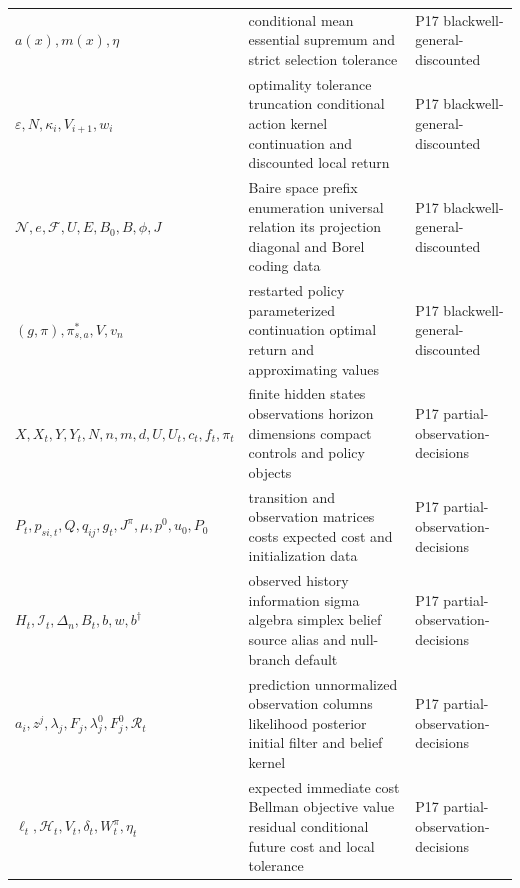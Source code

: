 \begin{longtable}{@{}p{}p{}p{}@{}}
\(a(x),\allowbreak m(x),\allowbreak \eta\) & conditional mean essential supremum and strict selection tolerance & P17 blackwell-\allowbreak{}general-\allowbreak{}discounted \\
\(\varepsilon,\allowbreak N,\allowbreak \kappa_i,\allowbreak V_{i+1},\allowbreak w_i\) & optimality tolerance truncation conditional action kernel continuation and discounted local return & P17 blackwell-\allowbreak{}general-\allowbreak{}discounted \\
\(\mathcal N,\allowbreak e,\allowbreak \mathcal F,\allowbreak U,\allowbreak E,\allowbreak B_0,\allowbreak B,\allowbreak \phi,\allowbreak J\) & Baire space prefix enumeration universal relation its projection diagonal and Borel coding data & P17 blackwell-\allowbreak{}general-\allowbreak{}discounted \\
\((g,\allowbreak \pi),\allowbreak \pi^*_{s,a},\allowbreak V,\allowbreak v_n\) & restarted policy parameterized continuation optimal return and approximating values & P17 blackwell-\allowbreak{}general-\allowbreak{}discounted \\
\(X,\allowbreak X_t,\allowbreak Y,\allowbreak Y_t,\allowbreak N,\allowbreak n,\allowbreak m,\allowbreak d,\allowbreak U,\allowbreak U_t,\allowbreak c_t,\allowbreak f_t,\allowbreak \pi_t\) & finite hidden states observations horizon dimensions compact controls and policy objects & P17 partial-\allowbreak{}observation-\allowbreak{}decisions \\
\(P_t,\allowbreak p_{si,t},\allowbreak Q,\allowbreak q_{ij},\allowbreak g_t,\allowbreak J^\pi,\allowbreak \mu,\allowbreak p^0,\allowbreak u_0,\allowbreak P_0\) & transition and observation matrices costs expected cost and initialization data & P17 partial-\allowbreak{}observation-\allowbreak{}decisions \\
\(H_t,\allowbreak \mathcal I_t,\allowbreak \Delta_n,\allowbreak B_t,\allowbreak b,\allowbreak w,\allowbreak b^\dagger\) & observed history information sigma algebra simplex belief source alias and null-branch default & P17 partial-\allowbreak{}observation-\allowbreak{}decisions \\
\(a_i,\allowbreak z^j,\allowbreak \lambda_j,\allowbreak F_j,\allowbreak \lambda_j^0,\allowbreak F_j^0,\allowbreak \mathcal R_t\) & prediction unnormalized observation columns likelihood posterior initial filter and belief kernel & P17 partial-\allowbreak{}observation-\allowbreak{}decisions \\
\(\ell_t,\allowbreak \mathcal H_t,\allowbreak V_t,\allowbreak \delta_t,\allowbreak W_t^\pi,\allowbreak \eta_t\) & expected immediate cost Bellman objective value residual conditional future cost and local tolerance & P17 partial-\allowbreak{}observation-\allowbreak{}decisions \\

\end{longtable}
